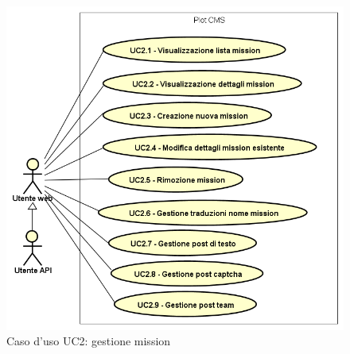         \begin{figure}[H]
            \centering
            \includegraphics[scale=0.95, width=\textwidth]{immagini/usecase/UC2.png}
            \caption{Caso d'uso UC2: gestione mission}\label{fig:UC2} 
        \end{figure}
